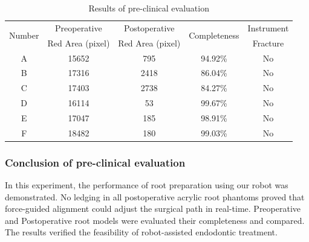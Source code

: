 \begin{table}[htbp]
\centering
\caption{Results of pre-clinical evaluation }
\label{tab:pre-clinical}
\begin{tabular}{ccccc} 
\hline \hline
\multirow{2}{*}{Number}	&Preoperative 		&Postoperative 		&\multirow{2}{*}{Completeness} 	&Instrument\\
						&Red Area (pixel)	&Red Area (pixel)	&								&Fracture	\\
\hline
A		&15652						&795						&94.92\%	&No\\
B		&17316						&2418						&86.04\%	&No\\
C		&17403						&2738						&84.27\%	&No\\
D		&16114						&53							&99.67\%	&No\\
E		&17047						&185						&98.91\%	&No\\
F		&18482						&180						&99.03\%	&No\\
\hline\hline
\end{tabular}
\end{table}
\subsubsection{Conclusion of pre-clinical evaluation}
\hspace*{6mm}In this experiment, the performance of root preparation using our robot was demonstrated. No ledging in all postoperative acrylic root phantoms proved that force-guided alignment could adjust the surgical path in real-time. Preoperative and Postoperative root models were evaluated their completeness and compared. The results verified the feasibility of robot-assisted endodontic treatment. 

